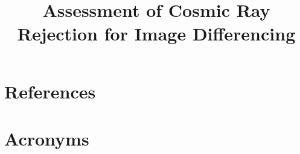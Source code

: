\documentclass[DM,lsstdraft,authoryear,toc]{lsstdoc}
\title{Assessment of Cosmic Ray Rejection for Image Differencing}
\date{\vcsDate}
\begin{document}
\maketitle


\appendix
\section{References} \label{sec:bib}
\renewcommand{\refname}{} %


\section{Acronyms} \label{sec:acronyms}

\end{document}
